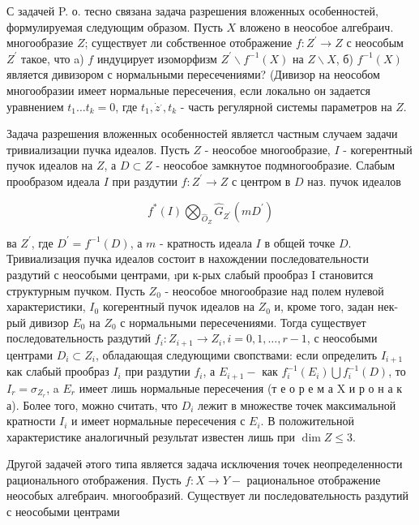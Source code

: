 \documentclass[10pt]{article}
\begin{document}
С задачей P. о. тесно связана задача разрешения вложенных особенностей, формулируемая следующим образом. Пусть $X$ вложено в неособое алгебраич. многообразие $Z$; существует ли собственное отображение $f: Z^{\prime} \rightarrow Z$ с неособым $Z^{\prime}$ такое, что a) $f$ индуцирует изоморфизм $Z^{\prime} \backslash f^{-1}(X)$ на $Z \backslash X$, б) $f^{-1}(X)$ является дивизором с нормальными пересечениями? (Дивизор на неособом многообразии имеет нормальные пересечения, если локально он задается уравнением $t_{1} \ldots t_{k}=0$, где $t_{1}, \dot{z}^{.}, t_{k}$ - часть регулярной системы параметров на $Z$.



Задача разрешения вложенных особенностей являетсл частным случаем задачи тривиализации пучка идеалов. Пусть $Z$ - неособое многообразие, $I$ - когерентный пучок идеалов на $Z$, а $D \subset Z$ - неособое замкнутое подмногообразие. Слабым прообразом идеала $I$ при раздутии $f: Z^{\prime} \rightarrow Z$ с центром в $D$ наз. пучок идеалов



\[

f^{*}(I) \bigotimes_{\widehat{O}_{Z}} \widehat{G}_{Z^{\prime}}\left(m D^{\prime}\right)

\]



ва $Z^{\prime}$, где $D^{\prime}=f^{-1}(D)$, а $m$ - кратность идеала $I$ в общей точке $D$. Тривиализация пучка идеалов состоит в нахождении последовательности раздутий с неособыми центрами, ıри к-рых слабый прообраз I становится структурным пучком. Пусть $Z_{0}$ - неособое многообразие над полем нулевой характеристики, $I_{0}$ когерентный пучок идеалов на $Z_{0}$ и, кроме того, задан нек-рый дивизор $E_{0}$ на $Z_{0}$ с нормальными пересечениями. Тогда существует последовательность раздутий $f_{i}: Z_{i+1} \rightarrow Z_{i}, i=0,1, \ldots, r-1$, с неособыми центрами $D_{i} \subset Z_{i}$, обладающая следующими свопствами: если определить $I_{i+1}$ как слабый прообраз $I_{i}$ при раздутии $f_{i}$, а $E_{i+1}-$ как $f_{i}^{-1}\left(E_{i}\right) \bigcup f_{i}^{-1}(D)$, то $I_{r}=\sigma_{Z_{r}}$, a $E_{r}$ имеет лишь нормальные пересечения (т е о р е м а $\mathrm{X}$ и р о н а к а). Более того, можно считать, что $D_{i}$ лежит в множестве точек максимальной кратности $I_{i}$ и имеет нормальные пересечения с $E_{i}$. В положительноӥ характеристике аналогичный результат известен лишь при $\operatorname{dim} Z \leqslant 3$.



Другой задачей әтого типа является задача исключения точек неопределенности рационального отображения. Пусть $f: X \rightarrow Y-$ рациональное отображение неособых алгебраич. многообразий. Существует ли последовательность раздутий с неособыми центрами
\end{document}
